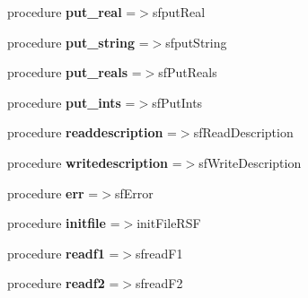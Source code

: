 \begin{DoxyCompactItemize}
procedure {\bfseries put\+\_\+real} =$>$sfput\+Real
\item 
\mbox{\label{structrsf__regfile__mod_1_1rsffile_a54852e0a1292d87c9c05883ae7fbcd08}} 
procedure {\bfseries put\+\_\+string} =$>$sfput\+String
\item 
\mbox{\label{structrsf__regfile__mod_1_1rsffile_a0e5b156071637831038eb515acea72a8}} 
procedure {\bfseries put\+\_\+reals} =$>$sf\+Put\+Reals
\item 
\mbox{\label{structrsf__regfile__mod_1_1rsffile_afceec4418ba9853760fc3efa339e118a}} 
procedure {\bfseries put\+\_\+ints} =$>$sf\+Put\+Ints
\item 
\mbox{\label{structrsf__regfile__mod_1_1rsffile_a8db5e82c7198089a329e986522fdeab3}} 
procedure {\bfseries readdescription} =$>$sf\+Read\+Description
\item 
\mbox{\label{structrsf__regfile__mod_1_1rsffile_a0e7afd20af24f1c6712534434f265b2a}} 
procedure {\bfseries writedescription} =$>$sf\+Write\+Description
\item 
\mbox{\label{structrsf__regfile__mod_1_1rsffile_ae5b9fded18a671633bdac14d0f44159f}} 
procedure {\bfseries err} =$>$sf\+Error
\item 
\mbox{\label{structrsf__regfile__mod_1_1rsffile_a977714006a838e9b69f34e7a49884cc2}} 
procedure {\bfseries initfile} =$>$init\+File\+R\+SF
\item 
\mbox{\label{structrsf__regfile__mod_1_1rsffile_a8b6809608c80cd06e241ad17666d6962}} 
procedure {\bfseries readf1} =$>$sfread\+F1
\item 
\mbox{\label{structrsf__regfile__mod_1_1rsffile_a0a8a149463b4fddcda4966738f61820f}} 
procedure {\bfseries readf2} =$>$sfread\+F2
\item 
\mbox{\label{structrsf__regfile__mod_1_1rsffile_aad605ae0c36ec571cdb00a7282a237cf}} 

\end{DoxyCompactItemize}
